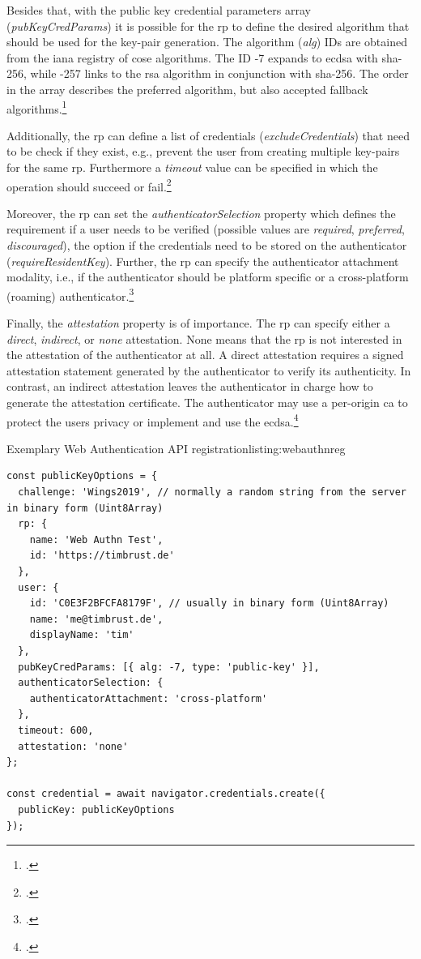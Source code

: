 Besides that, with the public key credential parameters array (\textit{pubKeyCredParams}) it is possible for the \gls{rp} to define the desired algorithm that should be used for the key-pair generation. The algorithm (\textit{alg}) IDs are obtained from the \gls{iana} registry of \gls{cose} algorithms. The ID -7 expands to \gls{ecdsa} with \gls{sha}-256, while -257 links to the \gls{rsa} algorithm in conjunction with \gls{sha}-256. The order in the array describes the preferred algorithm, but also accepted fallback algorithms.\footcites[See][Chapter 5.3, 11.3]{w3c}

Additionally, the \gls{rp} can define a list of credentials (\textit{excludeCredentials}) that need to be check if they exist, e.g., prevent the user from creating multiple key-pairs for the same \gls{rp}. Furthermore a \textit{timeout} value can be specified in which the operation should succeed or fail.\footcites[See][Chapter 5.4]{w3c}

Moreover, the \gls{rp} can set the \textit{authenticatorSelection} property which defines the requirement if a user needs to be verified (possible values are \textit{required}, \textit{preferred}, \textit{discouraged}), the option if the credentials need to be stored on the authenticator (\textit{requireResidentKey}). Further, the \gls{rp} can specify the authenticator attachment modality, i.e., if the authenticator should be platform specific or a cross-platform (roaming) authenticator.\footcites[See][Chapter 6.2.1]{w3c}

Finally, the \textit{attestation} property is of importance. The \gls{rp} can specify either a \textit{direct}, \textit{indirect}, or \textit{none} attestation. None means that the \gls{rp} is not interested in the attestation of the authenticator at all. A direct attestation requires a signed attestation statement generated by the authenticator to verify its authenticity. In contrast, an indirect attestation leaves the authenticator in charge how to generate the attestation certificate. The authenticator may use a per-origin \gls{ca} to protect the users privacy or implement and use the \gls{ecdsa}.\footcites[See][Chapter 5.4.6]{w3c}

\begin{example}{Exemplary Web Authentication API registration}{listing:webauthnreg}
\begin{verbatim}
const publicKeyOptions = {
  challenge: 'Wings2019', // normally a random string from the server in binary form (Uint8Array)
  rp: {
    name: 'Web Authn Test',
    id: 'https://timbrust.de'
  },
  user: {
    id: 'C0E3F2BFCFA8179F', // usually in binary form (Uint8Array)
    name: 'me@timbrust.de',
    displayName: 'tim'
  },
  pubKeyCredParams: [{ alg: -7, type: 'public-key' }],
  authenticatorSelection: {
    authenticatorAttachment: 'cross-platform'
  },
  timeout: 600,
  attestation: 'none'
};

const credential = await navigator.credentials.create({
  publicKey: publicKeyOptions
});
\end{verbatim}
\end{example}

